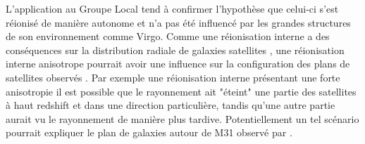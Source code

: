 L'application au Groupe Local tend à confirmer l'hypothèse que celui-ci s'est réionisé de manière autonome et n'a pas été influencé par les grandes structures de son environnement comme Virgo.
Comme une réionisation interne a des conséquences sur la distribution radiale de galaxies satellites \citep{2011MNRAS.417L..93O}, une réionisation interne anisotrope pourrait avoir une influence sur la configuration des plans de satellites observés \citep{2015ApJ...800...34G}.
Par exemple une réionisation interne présentant une forte anisotropie il est possible que le rayonnement ait "éteint" une partie des satellites à haut redshift et dans une direction particulière, tandis qu'une autre partie aurait vu le rayonnement de manière plus tardive.
Potentiellement un tel scénario pourrait expliquer le plan de galaxies autour de M31 observé par \cite{2014Natur.511..563I}.